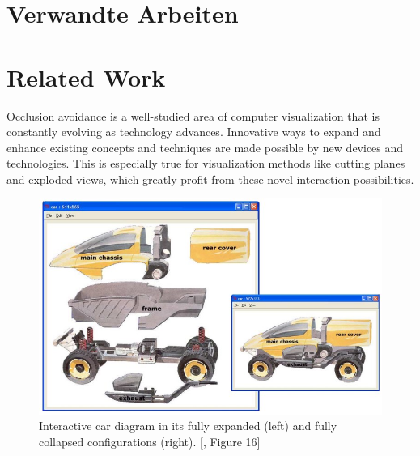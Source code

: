 {\chapter{Verwandte Arbeiten}}
{\chapter{Related Work}}
\label{sec:related}




Occlusion avoidance is a well-studied area of computer visualization that is constantly evolving as technology advances.
Innovative ways to expand and enhance existing concepts and techniques are made possible by new devices and technologies. 
This is especially true for visualization methods like cutting planes and exploded views, which greatly profit from these novel interaction possibilities.
\begin{figure}
	\centering
	\vspace{-0.8cm}
	\includegraphics[width=1\linewidth]{fig/Images/Li_ExplodedView_GI04_fig16}
	\caption[]{Interactive car diagram in its fully expanded (left) and fully collapsed configurations (right). [\cite{li2004interactive}, Figure 16]}
	\vspace{-1cm}
\end{figure}

